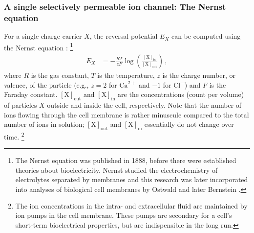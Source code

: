 \subsubsection{A single selectively permeable ion channel: The Nernst equation}
For a single charge carrier $X$, the reversal potential $E_X$ can be computed using the Nernst equation \citep{nernst1888kinetik}:%
\footnote{The Nernst equation was published in 1888, before there were established theories about bioelectricity. Nernst studied the electrochemistry of electrolytes separated by membranes and this research was later incorporated into analyses of biological cell membranes by Ostwald and later Bernstein \citep[see][Chapter~5]{bernstein1912elektrobiologie}.}
\newcommand{\Cout}[1]{\ensuremath{[\mathrm{#1}]_\mathrm{out}}}
\newcommand{\Cin}[1]{\ensuremath{[\mathrm{#1}]_\mathrm{in}}}
\begin{align}
	E_X &= -\frac{RT}{zF} \log \left( \frac{\Cin{X}}{\Cout{X}} \right) \,,
	\label{eqn:nernst}
\end{align}
where $R$ is the gas constant, $T$ is the temperature, $z$ is the charge number, or valence, of the particle (e.g., $z = 2$ for $\mathrm{Ca}^{2+}$ and $-1$ for $\mathrm{Cl}^-$) and $F$ is the Faraday constant. \Cout{X} and \Cin{X} are the concentrations (count per volume) of particles $X$ outside and inside the cell, respectively.
Note that the number of ions flowing through the cell membrane is rather minuscule compared to the total number of ions in solution; \Cout{X} and \Cin{X} essentially do not change over time.%
\footnote{The ion concentrations in the intra- and extracellular fluid are maintained by ion pumps in the cell membrane. These pumps are secondary for a cell's short-term bioelectrical properties, but are indispensible in the long run.}

